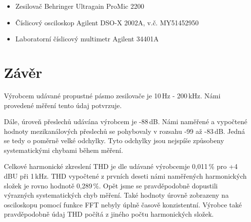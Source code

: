 \documentclass[a4paper, czech]{article}
\begin{document}
\begin{itemize}
    \item Zesilovač Behringer Ultragain ProMic 2200
    \item Číslicový osciloskop Agilent DSO-X 2002A, v.č. MY51452950
    \item Laboratorní číslicový multimetr Agilent 34401A
\end{itemize}

\section{Závěr}

Výrobcem udávané propustné pásmo zesilovače je 10\,Hz - 200\,kHz.
Námi provedené měření tento údaj potvrzuje.

Dále, úroveň přeslechů udávána výrobcem je -88\,dB.
Námi naměřené a vypočtené hodnoty mezikanálových přeslechů se pohybovaly v rozsahu -99 až -83\,dB.
Jedná se tedy o poměrně velké odchylky. Tyto odchylky jsou nejspíše způsobeny systematickými chybami během měření.

Celkové harmonické zkreslení THD je dle udávané výrobcemje 0,011\,\% pro +4\,dBU při 1\,kHz.
THD vypočtené z prvních deseti námi naměřených harmonických složek je rovno hodnotě 0,289\,\%.
Opět jsme se pravděpodobně dopustili výrazných systematických chyb měření.
Také hodnoty úrovně zobrazeny na osciloskopu pomocí funkce FFT nebyly úplně časově konzistentní.
Výrobce také pravděpodobně údaj THD počítá z jiného počtu harmonických složek.
\end{document}
